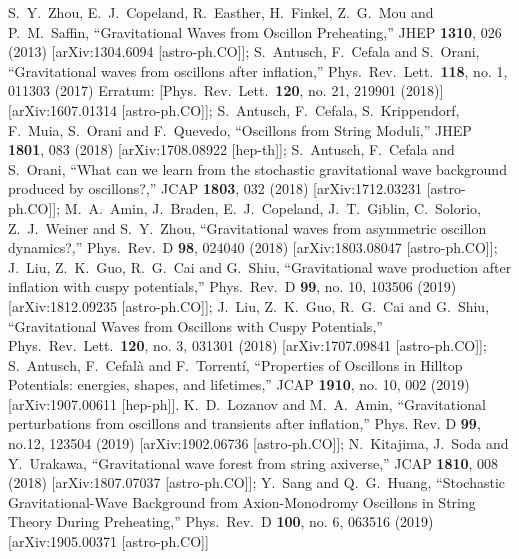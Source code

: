 \documentclass[%
aps,prd,nofootinbib,showkeys,a4paper,10pt
]{revtex4-2}
\begin{document}
\begin{thebibliography}{10}
S.~Y.~Zhou, E.~J.~Copeland, R.~Easther, H.~Finkel, Z.~G.~Mou and P.~M.~Saffin,
``Gravitational Waves from Oscillon Preheating,''
JHEP {\bf 1310}, 026 (2013)
[arXiv:1304.6094 [astro-ph.CO]];
S.~Antusch, F.~Cefala and S.~Orani,
``Gravitational waves from oscillons after inflation,''
Phys.\ Rev.\ Lett.\  {\bf 118}, no. 1, 011303 (2017)
Erratum: [Phys.\ Rev.\ Lett.\  {\bf 120}, no. 21, 219901 (2018)]
[arXiv:1607.01314 [astro-ph.CO]];
S.~Antusch, F.~Cefala, S.~Krippendorf, F.~Muia, S.~Orani and F.~Quevedo,
``Oscillons from String Moduli,''
JHEP {\bf 1801}, 083 (2018)
[arXiv:1708.08922 [hep-th]];
S.~Antusch, F.~Cefala and S.~Orani,
``What can we learn from the stochastic gravitational wave background produced by oscillons?,''
JCAP {\bf 1803}, 032 (2018)
[arXiv:1712.03231 [astro-ph.CO]];
M.~A.~Amin, J.~Braden, E.~J.~Copeland, J.~T.~Giblin, C.~Solorio, Z.~J.~Weiner and S.~Y.~Zhou,
``Gravitational waves from asymmetric oscillon dynamics?,''
Phys.\ Rev.\ D {\bf 98}, 024040 (2018)
[arXiv:1803.08047 [astro-ph.CO]];
J.~Liu, Z.~K.~Guo, R.~G.~Cai and G.~Shiu,
``Gravitational wave production after inflation with cuspy potentials,''
Phys.\ Rev.\ D {\bf 99}, no. 10, 103506 (2019)
[arXiv:1812.09235 [astro-ph.CO]];
J.~Liu, Z.~K.~Guo, R.~G.~Cai and G.~Shiu,
``Gravitational Waves from Oscillons with Cuspy Potentials,''
Phys.\ Rev.\ Lett.\  {\bf 120}, no. 3, 031301 (2018)
[arXiv:1707.09841 [astro-ph.CO]];
S.~Antusch, F.~Cefalà and F.~Torrentí,
``Properties of Oscillons in Hilltop Potentials: energies, shapes, and lifetimes,''
JCAP {\bf 1910}, no. 10, 002 (2019)
[arXiv:1907.00611 [hep-ph]].
K.~D.~Lozanov and M.~A.~Amin,
``Gravitational perturbations from oscillons and transients after inflation,''
Phys. Rev. D \textbf{99}, no.12, 123504 (2019)
[arXiv:1902.06736 [astro-ph.CO]];
N.~Kitajima, J.~Soda and Y.~Urakawa,
``Gravitational wave forest from string axiverse,''
JCAP {\bf 1810}, 008 (2018)
[arXiv:1807.07037 [astro-ph.CO]];
Y.~Sang and Q.~G.~Huang,
``Stochastic Gravitational-Wave Background from Axion-Monodromy Oscillons in String Theory During Preheating,''
Phys.\ Rev.\ D {\bf 100}, no. 6, 063516 (2019)
[arXiv:1905.00371 [astro-ph.CO]]  




\end{thebibliography}
\end{document}
